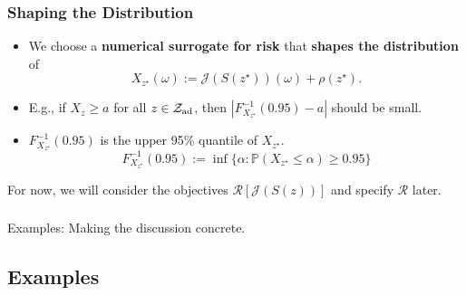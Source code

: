 \documentclass[aspectratio=169,xcolor=dvipsnames,10pt]{beamer}
\newcommand{\Zad}{\mathcal{Z}_{\text{\textup{ad}}}}
\newcommand{\risk}{\mathcal{R}}
\begin{document}
\begin{frame}\frametitle{Shaping the Distribution}
\begin{exampleblock}{}
\begin{itemize}
\item We choose a \textbf{numerical surrogate for risk} that \textbf{shapes the distribution} of
\[
X_{z^{\star}}(\omega) := \mathcal{J}(S(z^{\star}))(\omega) + \rho(z^{\star}).
\] 
\item E.g., if $X_{z} \ge a$ for all $z \in \Zad$, then  $|F_{X_{z^{\star}}}^{-1}(0.95)-a|$ should be small.
\item $F_{X_{z^{\star}}}^{-1}(0.95)$ is the upper 95\% quantile of $X_{z^{\star}}$.
\[
F_{X_{z^{\star}}}^{-1}(0.95) := \inf \{ \alpha : \mathbb P(X_{z^{\star}} \le \alpha ) \ge 0.95 \}
\]
\end{itemize}
\end{exampleblock}
\begin{exampleblock}{}
\centering
For now, we will consider the objectives $\risk[\mathcal{J}(S(z))]$ and specify $\risk$ later.
\end{exampleblock}
\end{frame}

\begin{frame}\frametitle{}
\begin{center}\Large
Examples: Making the discussion concrete.
\end{center}
\end{frame}

\subsection{Examples}
\end{document}
